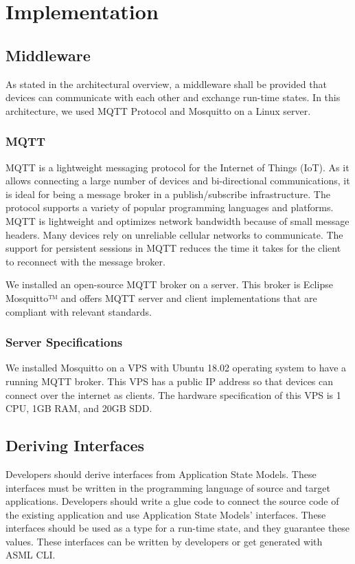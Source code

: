 \chapter{Implementation}
\label{ch:implementation}
\section{Middleware}
As stated in the architectural overview, a middleware shall be provided that devices can communicate with each other and exchange run-time states. In this architecture, we used MQTT Protocol and Mosquitto on a Linux server.

\subsection{MQTT}
MQTT is a lightweight messaging protocol for the Internet of Things (IoT). As it allows connecting a large number of devices and bi-directional communications, it is ideal for being a message broker in a publish/subscribe infrastructure. The protocol supports a variety of popular programming languages and platforms\cite{mqtt}. MQTT is lightweight and optimizes network bandwidth because of small message headers. Many devices rely on unreliable cellular networks to communicate. The support for persistent sessions in MQTT reduces the time it takes for the client to reconnect with the message broker.

We installed an open-source MQTT broker on a server. This broker is Eclipse Mosquitto™ and offers MQTT server and client implementations that are compliant with relevant standards.
\cite{mosquitto}

\subsection{Server Specifications}
We installed Mosquitto on a VPS with Ubuntu 18.02 operating system to have a running MQTT broker. This VPS has a public IP address so that devices can connect over the internet as clients. The hardware specification of this VPS is 1 CPU, 1GB RAM, and 20GB SDD. 

\section{Deriving Interfaces}
Developers should derive interfaces from Application State Models. These interfaces must be written in the programming language of source and target applications. Developers should write a glue code to connect the source code of the existing application and use Application State Models' interfaces. These interfaces should be used as a type for a run-time state, and they guarantee these values. These interfaces can be written by developers or get generated with ASML CLI.

